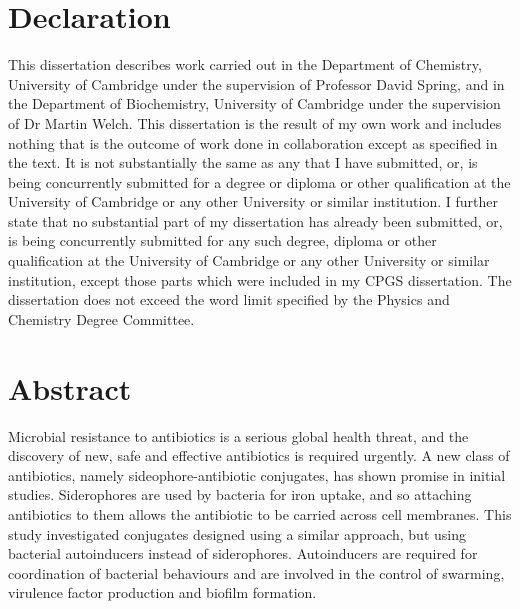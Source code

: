 \newpage

\section{Declaration}

This dissertation describes work carried out in the Department of Chemistry, University of Cambridge under the supervision of Professor David Spring, and in the Department of Biochemistry, University of Cambridge under the supervision of Dr Martin Welch. 
This dissertation is the result of my own work and includes nothing that is the outcome of work done in collaboration except as specified in the text. 
It is not substantially the same as any that I have submitted, or, is being concurrently submitted for a degree or diploma or other qualification at the University of Cambridge or any other University or similar institution. 
I further state that no substantial part of my dissertation has already been submitted, or, is being concurrently submitted for any such degree, diploma or other qualification at the University of Cambridge or any other University or similar institution, except those parts which were included in my CPGS dissertation.
The dissertation does not exceed the word limit specified by the Physics and Chemistry Degree Committee.




\newpage

\section{Abstract}

Microbial resistance to antibiotics is a serious global health threat, and the discovery of new, safe and effective antibiotics is required urgently. A new class of antibiotics, namely sideophore-antibiotic conjugates, has shown promise in initial studies. Siderophores are used by bacteria for iron uptake, and so attaching antibiotics to them allows the antibiotic to be carried across cell membranes. This study investigated conjugates designed using a similar approach, but using bacterial autoinducers instead of siderophores. Autoinducers are required for coordination of bacterial behaviours and are involved in the control of swarming, virulence factor production and biofilm formation. 

